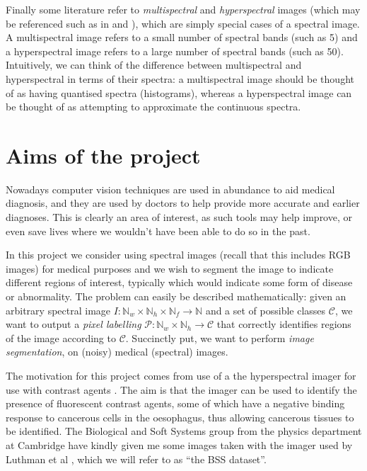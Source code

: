 \documentclass[12pt,twoside,notitlepage]{report}
\newcommand{\cl}[1]{\mathcal{#1}}
\newcommand{\bb}[1]{\mathbb{#1}}
\newcommand{\siris}{the BSS }
\begin{document}
        Finally some literature refer to \textit{multispectral} and \textit{hyperspectral} images (which may be 
        referenced such as in \cite{Luthman:2015:hyperspectralImager} and \cite{Bioucas-Dias:2012:unmixingOverview}), 
        which are simply special cases of a spectral image. A multispectral image refers to a small number of spectral 
        bands (such as 5) and a hyperspectral image refers to a large number of spectral bands (such as 50). Intuitively, 
        we can think of the difference between multispectral and hyperspectral in terms of their spectra: a 
        multispectral image should be thought of as having quantised spectra (histograms), whereas a hyperspectral 
        image can be thought of as attempting to approximate the continuous spectra.


    \section{Aims of the project} \label{sec:what_are_we_trying_to_do}
        Nowadays computer vision techniques are used in abundance to aid medical diagnosis, and they are used by doctors 
        to help provide more accurate and earlier diagnoses. This is clearly an area of interest, as such tools 
        may help improve, or even save lives where we wouldn't have been able to do so in the past. 

        In this project we consider using spectral images (recall that this includes RGB images) for medical purposes 
        and we wish to segment the image to indicate different regions of interest, typically which would indicate some form of 
        disease or abnormality. The problem can easily be described mathematically: given an arbitrary spectral image 
        $I : \bb{N}_w \times \bb{N}_h \times \bb{N}_f \rightarrow \bb{N}$ and a set of possible classes 
        $\cl{C}$, we want to output a \textit{pixel labelling} $\cl{P} : \bb{N}_w \times \bb{N}_h 
        \rightarrow \cl{C}$ that correctly identifies regions of the image according to $\cl{C}$. Succinctly 
        put, we want to perform \textit{image segmentation}, on (noisy) medical (spectral) images.

        The motivation for this project comes from use of a the hyperspectral imager for use with contrast agents 
        \cite{Luthman:2015:hyperspectralImager}. The aim is that the imager can be used to identify the presence of 
        fluorescent contrast agents, some of which have a negative binding response to cancerous cells in the oesophagus, 
        thus allowing cancerous tissues to be identified. The Biological and Soft Systems group from the physics department 
        at Cambridge have kindly given me some images taken with the imager used by Luthman et al \cite{Luthman:2015:hyperspectralImager},
        which we will refer to as ``\siris dataset''.
\end{document}
